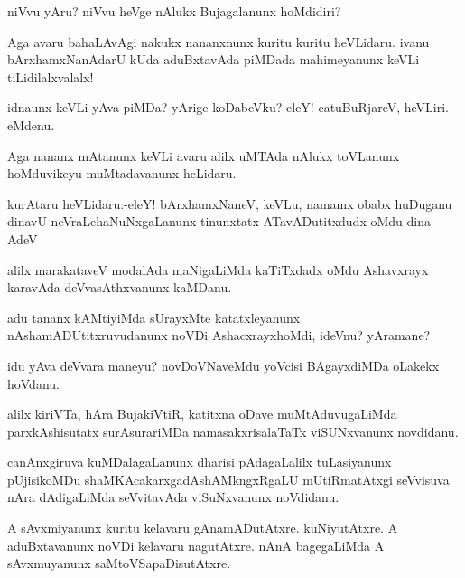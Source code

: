\documentclass{article}
\begin{document}
\begin{mn}%
niVvu yAru? niVvu heVge nAlukx Bujagalanunx hoMdidiri?
\end{mn}

\begin{mn}%
Aga avaru bahaLAvAgi nakukx nananxnunx  kuritu kuritu heVLidaru. ivanu bArxhamxNanAdarU 
kUda aduBxtavAda piMDada mahimeyanunx keVLi tiLidilalxvalalx!
\end{mn}

\begin{mn}%
idnaunx keVLi yAva piMDa? yArige koDabeVku? eleY! catuBuRjareV, heVLiri. eMdenu.
\end{mn}

\begin{mn}%
Aga nananx mAtanunx keVLi avaru alilx uMTAda nAlukx toVLanunx hoMduvikeyu muMtadavanunx 
heLidaru.
\end{mn}

\begin{mn}%
kurAtaru heVLidaru:-eleY! bArxhamxNaneV, keVLu, namamx obabx huDuganu dinavU 
neVraLehaNuNxgaLanunx  tinunxtatx ATavADutitxdudx oMdu dina AdeV
\end{mn}

\begin{mn}%
alilx marakataveV modalAda maNigaLiMda kaTiTxdadx oMdu Ashavxrayx karavAda 
deVvasAthxvanunx kaMDanu.
\end{mn}

\begin{mn}%
adu tananx kAMtiyiMda sUrayxMte katatxleyanunx nAshamADUtitxruvudanunx noVDi 
AshacxrayxhoMdi, ideVnu? yAramane?
\end{mn}

\begin{mn}%
idu yAva deVvara maneyu? novDoVNaveMdu yoVcisi BAgayxdiMDa oLakekx hoVdanu.
\end{mn}

\begin{mn}%
alilx kiriVTa, hAra BujakiVtiR, katitxna oDave muMtAduvugaLiMda parxkAshisutatx 
surAsurariMDa namasakxrisalaTaTx viSUNxvanunx novdidanu.
\end{mn}

\begin{mn}%
canAnxgiruva kuMDalagaLanunx dharisi pAdagaLalilx tuLasiyanunx pUjisikoMDu 
shaMKAcakarxgadAshAMkngxRgaLU mUtiRmatAtxgi seVvisuva nAra dAdigaLiMda seVvitavAda 
viSuNxvanunx noVdidanu.
\end{mn}

\begin{mn}%
A sAvxmiyanunx kuritu kelavaru gAnamADutAtxre. kuNiyutAtxre. A aduBxtavanunx noVDi 
kelavaru nagutAtxre. nAnA bagegaLiMda A sAvxmuyanunx saMtoVSapaDisutAtxre.
\end{mn}
\end{document}
